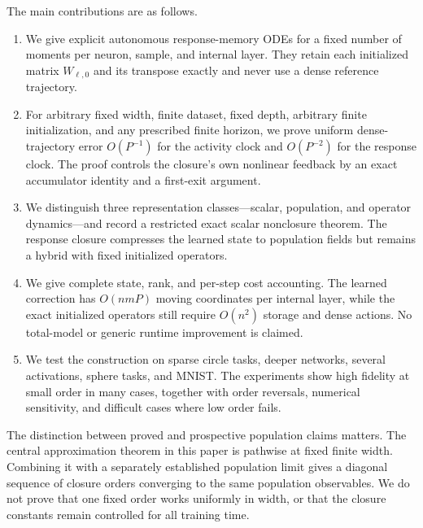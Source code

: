 The main contributions are as follows.
\begin{enumerate}[leftmargin=*,itemsep=0.35em]
\item We give explicit autonomous response-memory ODEs for a fixed number of
      moments per neuron, sample, and internal layer.  They retain each
      initialized matrix $W_{\ell,0}$ and its transpose exactly and never use
      a dense reference trajectory.
\item For arbitrary fixed width, finite dataset, fixed depth, arbitrary finite
      initialization, and any prescribed finite horizon, we prove uniform
      dense-trajectory error $O(P^{-1})$ for the activity clock and
      $O(P^{-2})$ for the response clock.  The proof controls the closure's
      own nonlinear feedback by an exact accumulator identity and a first-exit
      argument.
\item We distinguish three representation classes---scalar, population, and
      operator dynamics---and record a restricted exact scalar nonclosure
      theorem.  The response closure compresses the learned state to
      population fields but remains a hybrid with fixed initialized operators.
\item We give complete state, rank, and per-step cost accounting.  The learned
      correction has $O(nmP)$ moving coordinates per internal layer, while the
      exact initialized operators still require $O(n^2)$ storage and dense
      actions.  No total-model or generic runtime improvement is claimed.
\item We test the construction on sparse circle tasks, deeper networks,
      several activations, sphere tasks, and MNIST.  The experiments show high
      fidelity at small order in many cases, together with order reversals,
      numerical sensitivity, and difficult cases where low order fails.
\end{enumerate}

The distinction between proved and prospective population claims matters.
The central approximation theorem in this paper is pathwise at fixed finite
width.  Combining it with a separately established population limit gives a
diagonal sequence of closure orders converging to the same population
observables.  We do not prove that one fixed order works uniformly in width,
or that the closure constants remain controlled for all training time.
